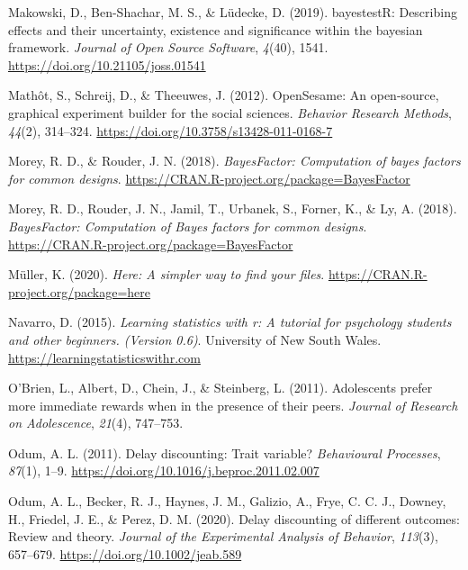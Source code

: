 \documentclass[
  pub,floatsintext]{apa6}
\newlength{\cslhangindent}
\newlength{\cslentryspacingunit} %
\newenvironment{CSLReferences}[2] %
 {%
  \setlength{\parindent}{0pt}
  \ifodd #1
  \let\oldpar\par
  \def\par{\hangindent=\cslhangindent\oldpar}
  \fi
  \setlength{\parskip}{#2\cslentryspacingunit}
 }%
 {}
\begin{document}
\begin{CSLReferences}{1}{0}
\leavevmode{}%
Makowski, D., Ben-Shachar, M. S., \& Lüdecke, D. (2019). bayestestR: Describing effects and their uncertainty, existence and significance within the bayesian framework. \emph{Journal of Open Source Software}, \emph{4}(40), 1541. \url{https://doi.org/10.21105/joss.01541}

\leavevmode{}%
Mathôt, S., Schreij, D., \& Theeuwes, J. (2012). {OpenSesame}: {An} open-source, graphical experiment builder for the social sciences. \emph{Behavior Research Methods}, \emph{44}(2), 314--324. \url{https://doi.org/10.3758/s13428-011-0168-7}

\leavevmode{}%
Morey, R. D., \& Rouder, J. N. (2018). \emph{BayesFactor: Computation of bayes factors for common designs}. \url{https://CRAN.R-project.org/package=BayesFactor}

\leavevmode{}%
Morey, R. D., Rouder, J. N., Jamil, T., Urbanek, S., Forner, K., \& Ly, A. (2018). \emph{{BayesFactor}: {Computation} of {Bayes} factors for common designs}. \url{https://CRAN.R-project.org/package=BayesFactor}

\leavevmode{}%
Müller, K. (2020). \emph{Here: A simpler way to find your files}. \url{https://CRAN.R-project.org/package=here}

\leavevmode{}%
Navarro, D. (2015). \emph{Learning statistics with r: A tutorial for psychology students and other beginners. (Version 0.6)}. University of New South Wales. \url{https://learningstatisticswithr.com}

\leavevmode{}%
O'Brien, L., Albert, D., Chein, J., \& Steinberg, L. (2011). Adolescents prefer more immediate rewards when in the presence of their peers. \emph{Journal of Research on Adolescence}, \emph{21}(4), 747--753.

\leavevmode{}%
Odum, A. L. (2011). Delay discounting: {Trait} variable? \emph{Behavioural Processes}, \emph{87}(1), 1--9. \url{https://doi.org/10.1016/j.beproc.2011.02.007}

\leavevmode{}%
Odum, A. L., Becker, R. J., Haynes, J. M., Galizio, A., Frye, C. C. J., Downey, H., Friedel, J. E., \& Perez, D. M. (2020). Delay discounting of different outcomes: {Review} and theory. \emph{Journal of the Experimental Analysis of Behavior}, \emph{113}(3), 657--679. \url{https://doi.org/10.1002/jeab.589}


\end{CSLReferences}
\end{document}
